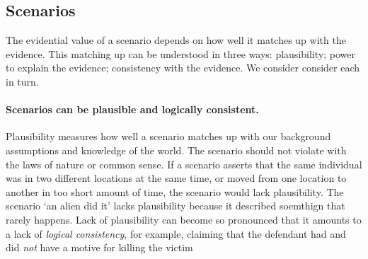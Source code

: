 \documentclass[10pt]{article}
\begin{document}

\subsection{Scenarios}

The evidential value of a scenario depends on how well it matches up with the evidence. 
This matching up can be understood in three ways: plausibility; power to explain the evidence; 
consistency with the evidence. 
We consider consider each in turn.


\paragraph{Scenarios can be plausible and logically consistent.}

Plausibility measures how well a scenario matches up with 
our background assumptions and knowledge of the world. %
The scenario should not violate with the laws of nature or common sense. If a scenario asserts that the same individual was in two different locations 
at the same time, or moved from one location to another in too short amount of time, the scenario would lack plausibility.  
The scenario `an alien did it' lacks plausibility because it described soemthign that rarely happens. 
Lack of plausibility can become so pronounced that it amounts to a lack of \textit{logical consistency}, for example, claiming that 
 the defendant had and did \textit{not} have a motive for killing the victim
 
\end{document}
